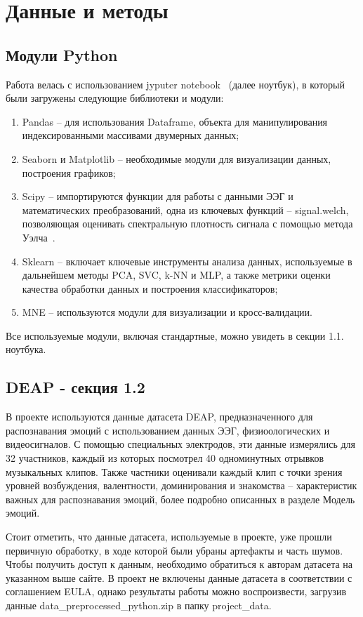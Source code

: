 \documentclass{article}
\begin{document}
\section{Данные и методы}
\subsection{Модули Python}
Работа велась с использованием jyputer notebook~\cite{jyputer} (далее ноутбук), в который были загружены следующие библиотеки и модули:
\begin{enumerate}
\item Pandas -- для использования Dataframe, объекта для манипулирования индексированными массивами двумерных данных;
\item Seaborn и Matplotlib -- необходимые модули для визуализации данных, построения графиков;
\item Scipy -- импортируются функции для работы с данными ЭЭГ и математических преобразований, одна из ключевых функций -- signal.welch, позволяющая оценивать спектральную плотность сигнала с помощью метода Уэлча~\cite{Welch}.
\item Sklearn -- включает ключевые инструменты анализа данных, используемые в дальнейшем методы PCA, SVC, k-NN и MLP, а также метрики оценки качества обработки данных и построения классификаторов;
\item MNE -- используются модули для визуализации и кросс-валидации.
\end{enumerate}
Все используемые модули, включая стандартные, можно увидеть в секции 1.1. ноутбука.

\subsection{DEAP - секция 1.2}
В проекте используются данные датасета DEAP, предназначенного для распознавания эмоций с использованием данных ЭЭГ, физиоологических и видеосигналов. С помощью специальных электродов, эти данные измерялись для 32 участников, каждый из которых посмотрел 40 одноминутных отрывков музыкальных клипов. Также частники оценивали каждый клип с точки зрения уровней возбуждения, валентности, доминирования и знакомства -- характеристик важных для распознавания эмоций, более подробно описанных в разделе Модель эмоций.

Стоит отметить, что данные датасета, используемые в проекте, уже прошли первичную обработку, в ходе которой были убраны артефакты и часть шумов. Чтобы получить доступ к данным, необходимо обратиться к авторам датасета на указанном выше сайте. В проект не включены данные датасета в соответствии с соглашением EULA, однако результаты работы можно воспроизвести, загрузив данные data\_preprocessed\_python.zip в папку project\_data.
\end{document}

